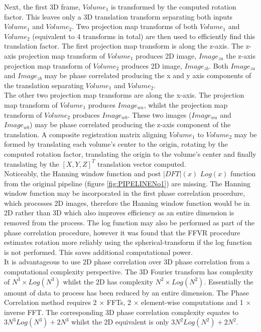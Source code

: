Next, the first 3D frame, $Volume_1$ is transformed by the computed rotation factor. This leaves only a 3D translation transform separating both inputs $Volume_1$ and $Volume_2$. Two projection map transforms of both $Volume_1$ and $Volume_2$ (equivalent to 4 transforms in total) are then used to efficiently find this translation factor. The first projection map transform is along the z-axis. The z-axis projection map transform of $Volume_1$ produces 2D image, $Image_{za}$ the z-axis projection map transform of $Volume_2$ produces 2D image, $Image_{zb}$. Both $Image_{za}$ and $Image_{zb}$ may be phase correlated producing the x and y axis components of the translation separating $Volume_1$ and $Volume_2$. \\

The other two projection map transforms are along the x-axis. The projection map transform of $Volume_1$ produces $Image_{wa}$, whilst the projection map transform of $Volume_2$ produces $Image_{wb}$. These two images ($Image_{wa}$ and $Image_{wb}$) may be phase correlated producing the z-axis component of the translation. A composite registration matrix aligning $Volume_1$ to $Volume_2$ may be formed by translating each volume's center to the origin, rotating by the computed rotation factor, translating the origin to the volume's center and finally translating by the $[X,Y,Z]^T$ translation vector computed. \\

Noticeably, the Hanning window function and post $|DFT|(x)$ $Log(x)$ function from the original pipeline (figure \ref{fig:PIPELINENo1}) are missing. The Hanning window function may be incorporated in the first phase correlation procedure, which processes 2D images, therefore the Hanning window function would be in 2D rather than 3D which also improves efficiency as an entire dimension is removed from the process. The log function may also be performed as part of the phase correlation procedure, however it was found that the FFVR procedure estimates rotation more reliably using the spherical-transform if the log function is not performed. This saves additional computational power. \\

It is advantageous to use 2D phase correlation over 3D phase correlation from a computational complexity perspective. The 3D Fourier transform has complexity of $N^3 \times Log(N^3)$ whilst the 2D has complexity $N^2 \times Log(N^2)$. Essentially the amount of data to process has been reduced by an entire dimension. The Phase Correlation method requires 2 $\times$ FFTs, 2 $\times$ element-wise computations and 1 $\times$ inverse FFT. The corresponding 3D phase correlation complexity equates to $3N^3Log(N^3) + 2N^3$ whilst the 2D equivalent is only $3N^2Log(N^2) + 2N^2$. \\ 

